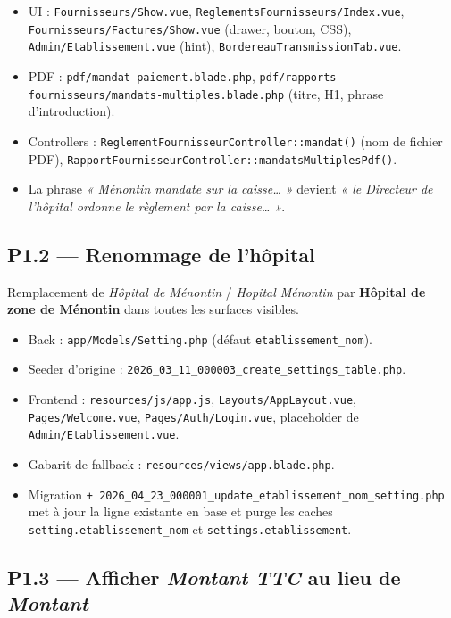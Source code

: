 \documentclass[11pt,a4paper]{article}
\newcommand{\modfile}[1]{\texttt{\small #1}}
\newcommand{\newfile}[1]{\texttt{\small\textcolor{accent}{+ #1}}}
\begin{document}
\begin{itemize}[leftmargin=1.4em]
  \item UI : \modfile{Fournisseurs/Show.vue}, \modfile{ReglementsFournisseurs/Index.vue},
    \modfile{Fournisseurs/Factures/Show.vue} (drawer, bouton, CSS),
    \modfile{Admin/Etablissement.vue} (hint), \modfile{BordereauTransmissionTab.vue}.
  \item PDF : \modfile{pdf/mandat-paiement.blade.php},
    \modfile{pdf/rapports-fournisseurs/mandats-multiples.blade.php} (titre, H1, phrase d'introduction).
  \item Controllers : \modfile{ReglementFournisseurController::mandat()} (nom de fichier PDF),
    \modfile{RapportFournisseurController::mandatsMultiplesPdf()}.
  \item La phrase \emph{« Ménontin mandate sur la caisse\dots{} »} devient \emph{« le Directeur de
    l'hôpital ordonne le règlement par la caisse\dots{} »}.
\end{itemize}

\subsection{P1.2 --- Renommage de l'hôpital}

Remplacement de \emph{Hôpital de Ménontin} / \emph{Hopital Ménontin} par
\textbf{Hôpital de zone de Ménontin} dans toutes les surfaces visibles.

\begin{itemize}[leftmargin=1.4em]
  \item Back : \modfile{app/Models/Setting.php} (défaut \texttt{etablissement\_nom}).
  \item Seeder d'origine : \modfile{2026\_03\_11\_000003\_create\_settings\_table.php}.
  \item Frontend : \modfile{resources/js/app.js}, \modfile{Layouts/AppLayout.vue},
    \modfile{Pages/Welcome.vue}, \modfile{Pages/Auth/Login.vue}, placeholder de
    \modfile{Admin/Etablissement.vue}.
  \item Gabarit de fallback : \modfile{resources/views/app.blade.php}.
  \item Migration \newfile{2026\_04\_23\_000001\_update\_etablissement\_nom\_setting.php}
    met à jour la ligne existante en base et purge les caches
    \texttt{setting.etablissement\_nom} et \texttt{settings.etablissement}.
\end{itemize}

\subsection{P1.3 --- Afficher \emph{Montant TTC} au lieu de \emph{Montant}}
\end{document}
